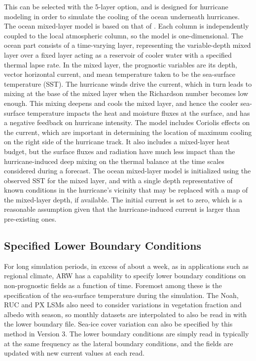 This can be selected with the 5-layer option, and is designed for
hurricane modeling in order to simulate the cooling of the ocean underneath
hurricanes. The ocean mixed-layer model is based on that of \citet{pollard73}. Each column is independently coupled to the local atmospheric column, so the model is one-dimensional. The ocean part consists of a time-varying layer, representing the variable-depth mixed layer over a fixed layer acting as a reservoir of cooler water with a specified thermal lapse rate. In the mixed layer, the prognostic variables are its depth, vector horizontal current, and mean temperature taken to be the sea-surface temperature (SST). The hurricane winds drive the current, which in turn leads to mixing at the base of the mixed layer when the Richardson number becomes low enough. This mixing deepens and cools the mixed layer, and hence the cooler sea-surface temperature impacts the heat and moisture fluxes at the surface, and has a negative feedback on hurricane intensity. The model includes Coriolis effects on the current, which are important in determining the location of maximum cooling on the right side of the hurricane track. It also includes a mixed-layer heat budget, but the surface fluxes and radiation have much less impact than the hurricane-induced deep mixing on the thermal balance at the time scales considered during a forecast. The ocean mixed-layer model is initialized using the observed SST for the mixed layer, and with a single depth representative of known conditions in the hurricane's vicinity that may be replaced with a map of the mixed-layer depth, if available. The initial current is set to zero, which is a reasonable assumption given that the hurricane-induced current is larger than pre-existing ones.


\subsection{Specified Lower Boundary Conditions}

For long simulation periods, in excess of about a week, as in applications such as 
regional climate, ARW has a capability to specify lower boundary conditions 
on non-prognostic fields as
a function of time. Foremost among these is the specification of the 
sea-surface temperature during the simulation. The Noah, RUC and PX LSMs also
need to consider variations in vegetation fraction and albedo with season, so
monthly datasets are interpolated to also be read in with the lower boundary file.
Sea-ice cover variation can also be specified by this method in Version 3.
The lower boundary conditions are simply read in typically at the
same frequency as the lateral boundary conditions, and the fields are
updated with new current values at each read.

